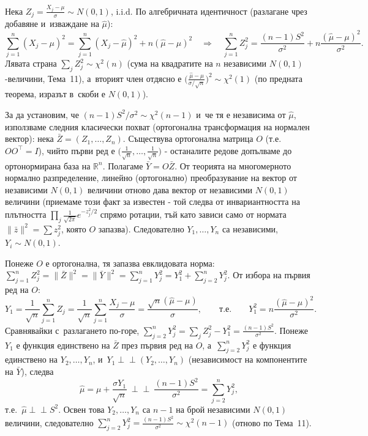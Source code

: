 \begin{proofbox}
Нека $Z_j=\tfrac{X_j-\mu}\sigma\sim N(0,1)$, i.i.d. По алгебричната
идентичност (разлагане чрез добавяне и~изваждане на $\hat\mu$):
\[
  \sum_{j=1}^n (X_j-\mu)^2 = \sum_{j=1}^n (X_j-\hat\mu)^2 + n(\hat\mu-\mu)^2
  \quad\Longrightarrow\quad
  \sum_{j=1}^n Z_j^2 = \frac{(n-1)S^2}{\sigma^2} + n\frac{(\hat\mu-\mu)^2}{\sigma^2}.
\]
Лявата страна $\sum_j Z_j^2\sim\chi^2(n)$ (сума на квадратите на $n$
независими $N(0,1)$-величини, Тема~11), а~вторият член отдясно е
$\big(\tfrac{\hat\mu-\mu}{\sigma/\sqrt n}\big)^2 \sim \chi^2(1)$ (по
предната теорема, изразът в~скоби е $N(0,1)$).

За да установим, че $(n-1)S^2/\sigma^2\sim\chi^2(n-1)$ и~че тя е
независима от $\hat\mu$, използваме следния класически похват
(ортогонална трансформация на нормален вектор): нека $\bar Z=(Z_1,
\dots,Z_n)$. Съществува ортогонална матрица $O$ (т.е.\ $OO^\top=I$),
чийто първи ред е $\big(\tfrac1{\sqrt n},\dots,\tfrac1{\sqrt n}\big)$
- останалите редове допълваме до ортонормирана база на $\mathbb
R^n$. Полагаме $\bar Y = O\bar Z$. От теорията на многомерното
нормално разпределение, линейно (ортогонално) преобразувание на
вектор от независими $N(0,1)$ величини отново дава вектор от
независими $N(0,1)$ величини (приемаме този факт за известен -
той следва от инвариантността на плътността $\prod_j\frac1{\sqrt
{2\pi}}e^{-z_j^2/2}$ спрямо ротации, тъй като зависи само от нормата
$\|\bar z\|^2=\sum z_j^2$, която $O$ запазва). Следователно $Y_1,
\dots,Y_n$ са независими, $Y_i\sim N(0,1)$.

Понеже $O$ е ортогонална, тя запазва евклидовата норма:
$\sum_{j=1}^n Z_j^2 = \|\bar Z\|^2 = \|\bar Y\|^2 = \sum_{j=1}^n
Y_j^2 = Y_1^2 + \sum_{j=2}^n Y_j^2$. От избора на първия ред на $O$:
\[
  Y_1 = \frac1{\sqrt n}\sum_{j=1}^n Z_j = \frac1{\sqrt n}\sum_{j=1}^n \frac{X_j-\mu}\sigma = \frac{\sqrt n(\hat\mu-\mu)}\sigma,
  \qquad\text{т.е.}\qquad Y_1^2 = n\frac{(\hat\mu-\mu)^2}{\sigma^2}.
\]
Сравнявайки с~разлагането по-горе, $\sum_{j=2}^n Y_j^2 = \sum_j
Z_j^2 - Y_1^2 = \tfrac{(n-1)S^2}{\sigma^2}$. Понеже $Y_1$ е функция
единствено на $\bar Z$ през първия ред на $O$, а~$\sum_{j=2}^nY_j^2$
е функция единствено на $Y_2,\dots,Y_n$, и~$Y_1\perp\!\!\!\perp
(Y_2,\dots,Y_n)$ (независимост на компонентите на $\bar Y$), следва
\[
  \hat\mu = \mu+\frac{\sigma Y_1}{\sqrt n}\ \perp\!\!\!\perp\ \frac{(n-1)S^2}{\sigma^2} = \sum_{j=2}^n Y_j^2,
\]
т.е.\ $\hat\mu\perp\!\!\!\perp S^2$. Освен това $Y_2,\dots,Y_n$ са
$n-1$ на брой независими $N(0,1)$ величини, следователно
$\sum_{j=2}^n Y_j^2 = \tfrac{(n-1)S^2}{\sigma^2}\sim\chi^2(n-1)$
(отново по Тема~11). \qedbg
\end{proofbox}

